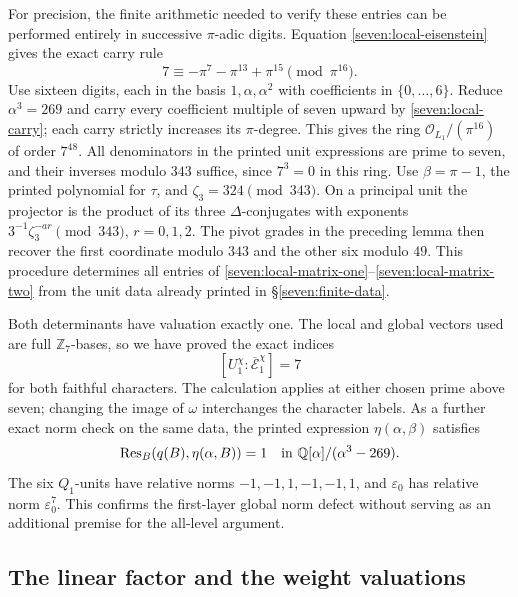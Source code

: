 \documentclass[11pt]{article}
\begin{document}
For precision, the finite arithmetic needed to verify these entries
can be performed entirely in successive $\pi$-adic digits. Equation
\eqref{seven:local-eisenstein} gives the exact carry rule
\begin{equation*}\tag{U14}\label{seven:local-carry}
 7\equiv-\pi^7-\pi^{13}+\pi^{15}\pmod{\pi^{16}}.
\end{equation*}
Use sixteen digits, each in the basis
$1,\alpha,\alpha^2$ with coefficients in $\{0,\ldots,6\}$.
Reduce $\alpha^3=269$ and carry every coefficient multiple of seven
upward by \eqref{seven:local-carry}; each carry strictly increases its
$\pi$-degree. This gives the ring
$\mathcal O_{L_1}/(\pi^{16})$ of order $7^{48}$.
All denominators in the printed unit expressions are prime to seven,
and their inverses modulo $343$ suffice, since $7^3=0$ in this ring.
Use $\beta=\pi-1$, the printed polynomial for $\tau$, and
$\zeta_3=324\pmod{343}$. On a principal unit the projector is the
product of its three $\Delta$-conjugates with exponents
$3^{-1}\zeta_3^{-ar}\pmod{343}$, $r=0,1,2$.
The pivot grades in the preceding lemma then recover the first
coordinate modulo $343$ and the other six modulo $49$.
This procedure determines all entries of
\eqref{seven:local-matrix-one}--\eqref{seven:local-matrix-two} from the
unit data already printed in \S\ref{seven:finite-data}.

Both determinants have valuation exactly one. The local and global
vectors used are full $\mathbb Z_7$-bases, so we have proved the exact
indices
\begin{equation*}\tag{U15}\label{seven:first-layer-local-index}
 [U_1^\chi:\overline{\mathcal E}_1^\chi]=7
\end{equation*}
for both faithful characters. The calculation applies at either
chosen prime above seven; changing the image of $\omega$ interchanges
the character labels.
As a further exact norm check on the same data, the printed expression
$\eta(\alpha,\beta)$ satisfies
\[
 \operatorname{Res}_B(q(B),\eta(\alpha,B))=1
 \quad\hbox{in }\mathbb Q[\alpha]/(\alpha^3-269).
\]
The six $Q_1$-units have relative norms
$-1,-1,1,-1,-1,1$, and $\varepsilon_0$ has relative norm
$\varepsilon_0^7$. This confirms the first-layer global norm defect
without serving as an additional premise for the all-level argument.

\subsection{The linear factor and the weight valuations}
\end{document}
